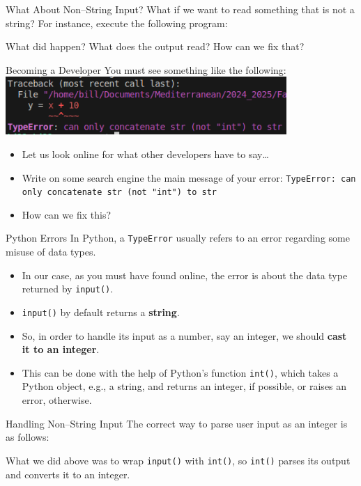 \documentclass[aspectratio=169, 12pt, xcolor=table]{beamer}
\begin{document}
	\begin{frame}{What About Non--String Input?}
		What if we want to read something that is not a string? For instance, execute the following program:
		
		What did happen? What does the output read? How can we fix that?
	\end{frame}

	\begin{frame}{Becoming a Developer}
		You must see something like the following:
		\includegraphics[width=0.8\textwidth]{./assets/type_error.png}
		\begin{itemize}
			\item Let us look online for what other developers have to say\ldots
			\item Write on some search engine the main message of your error: \texttt{TypeError:\ can only concatenate str (not "int") to str}
			\item How can we fix this?
		\end{itemize}
	\end{frame}

	\begin{frame}{Python Errors}
		In Python, a \texttt{TypeError} usually refers to an error regarding some misuse of data types.
		\begin{itemize}
			\item In our case, as you must have found online, the error is about the data type returned by \texttt{input()}.
			\item \texttt{input()} by default returns a \textbf{string}.
			\item So, in order to handle its input as a number, say an integer, we should \textbf{cast it to an integer}.
			\item This can be done with the help of Python's function \texttt{int()}, which takes a Python object, e.g., a string, and returns an integer, if possible, or raises an error, otherwise.
		\end{itemize}
	\end{frame}

	\begin{frame}{Handling Non--String Input}
		The correct way to parse user input as an integer is as follows:
		
		What we did above was to wrap \texttt{input()} with \texttt{int()}, so \texttt{int()} parses its output and converts it to an integer.
	\end{frame}
\end{document}
